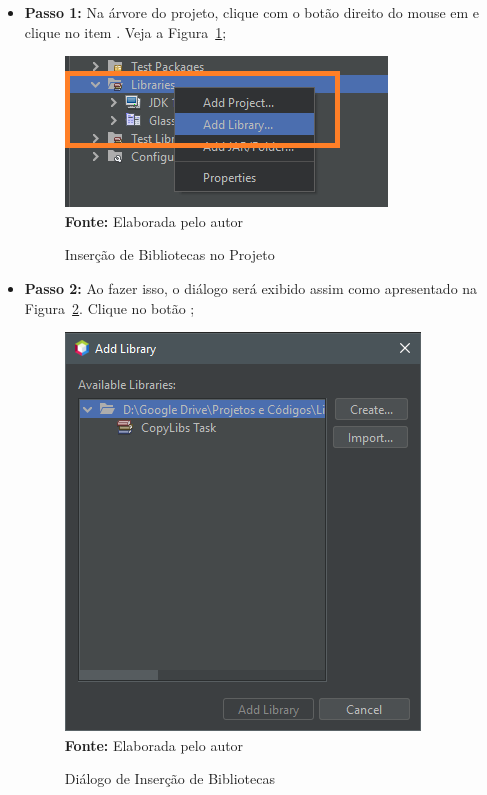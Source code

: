 \begin{itemize}
    
    \item \textbf{Passo 1:} Na árvore do projeto, clique com o botão direito do mouse em  e clique no item . Veja a Figura~\ref{fig:cap01AddLibraryProjeto};
    
    \FloatBarrier
    \begin{figure}[!htbp]
        \centering
        \caption{Inserção de Bibliotecas no Projeto}
        \includegraphics[scale=0.9]{imagens/cap01AddLibraryProjeto}
        \\\textbf{Fonte:} Elaborada pelo autor
        \label{fig:cap01AddLibraryProjeto}
    \end{figure}
    \FloatBarrier
    
    \item \textbf{Passo 2:} Ao fazer isso, o diálogo  será exibido assim como apresentado na Figura~\ref{fig:cap01AddLibraryDialog}. Clique no botão ;
    
    \FloatBarrier
    \begin{figure}[!htbp]
        \centering
        \caption{Diálogo de Inserção de Bibliotecas}
        \includegraphics[scale=0.9]{imagens/cap01AddLibraryDialog}
        \\\textbf{Fonte:} Elaborada pelo autor
        \label{fig:cap01AddLibraryDialog}
    \end{figure}
    \FloatBarrier
    

\end{itemize}
